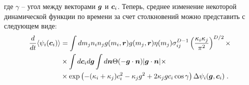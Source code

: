 где $\gamma$ -- угол между векторами $\bm{g}$ и $\bm{c}_i$. Теперь, среднее изменение некоторой динамической функции по времени
за счет столкновений можно представить с следующем виде:
\begin{equation}
  \begin{split}
    \frac{d}{dt}\langle\psi_i(\bm{c}_i)\rangle &= \int dm_jn_in_jg(m_i,\bm{r})g(m_j,\bm{r})\eta(m_j)
    \sigma^{D-1}_{ij}\left(\frac{\kappa_i\kappa_j}{\pi^2}\right)^{D/2}\times\\
    &\times\int d\bm{c}_id\bm{g}\int d\bm{n}\Theta(-\bm{g}\cdot\bm{n})\vert\bm{g}\cdot\bm{n}\vert\times\\
    &\times\exp\left(-(\kappa_i+\kappa_j)c^2_i-\kappa_jg^2+2\kappa_jgc_i\cos\gamma\right)\Delta\psi_i(\bm{g},\bm{c}_i)\;.
  \end{split}
\end{equation}

